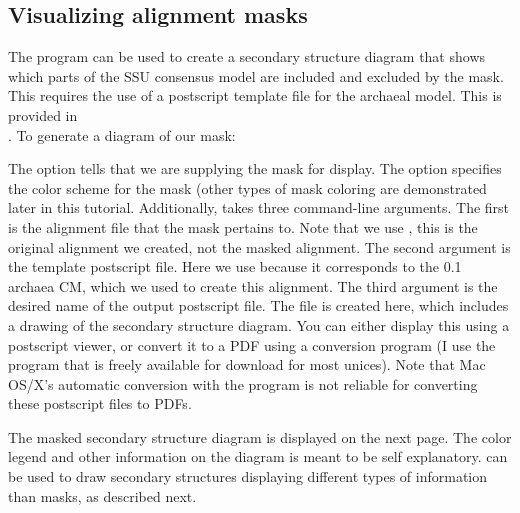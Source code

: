 

\subsection{Visualizing alignment masks}

The  program can be used to create a secondary
structure diagram that shows which parts of the SSU consensus model
are included and excluded by the mask. This requires the use of a
postscript template file for the archaeal model. This is provided in 
\\ . 
To generate a diagram of our mask:


The  option tells  that we are
supplying the mask  for display. The 
option specifies the color scheme for the mask (other types of mask
coloring are demonstrated later in this tutorial. Additionally, 
 takes three command-line arguments. The first is
the alignment file that the mask pertains to. Note that we use
, this is the original alignment we created,
not the masked alignment. The second argument is the template
postscript file. Here we use  because it corresponds
to the  0.1 archaea CM, which we used to create this
alignment. The third argument is the desired name of the output
postscript file. The  file is created here, which
includes a drawing of the secondary structure diagram. You can either
display this using a postscript viewer, or convert it to a PDF using a
conversion program (I use the  program that is freely
available for download for most unices). Note that Mac OS/X's
automatic conversion with the  program is not reliable
for converting these postscript files to PDFs.

The masked secondary structure diagram is displayed on the next page.
The color legend and other information on the diagram is meant to be
self explanatory.  can be used to draw secondary
structures displaying different types of information than masks, as
described next.

